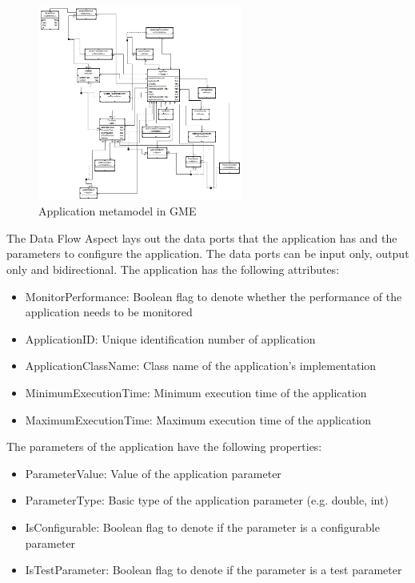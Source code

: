 \begin{figure}
	\centering
		\includegraphics[width=0.60\textwidth]{figures/ApplicationMetaModel.png}
	\caption{Application metamodel in GME}
	\label{fig:ApplicationMetaModel}
\end{figure}

The Data Flow Aspect lays out the data ports that the application has and the parameters to configure the application. The data ports can be input only, output only and bidirectional. The application has the following attributes:

\begin{itemize}
	\item MonitorPerformance: Boolean flag to denote whether the performance of the application needs to be monitored
	\item ApplicationID: Unique identification number of application
	\item ApplicationClassName: Class name of the application's implementation
	\item MinimumExecutionTime: Minimum execution time of the application
	\item MaximumExecutionTime: Maximum execution time of the application
\end{itemize}

The parameters of the application have the following properties:

\begin{itemize}
	\item ParameterValue: Value of the application parameter
	\item ParameterType: Basic type of the application parameter (e.g. double, int)
	\item IsConfigurable: Boolean flag to denote if the parameter is a configurable parameter
	\item IsTestParameter: Boolean flag to denote if the parameter is a test parameter
\end{itemize}

